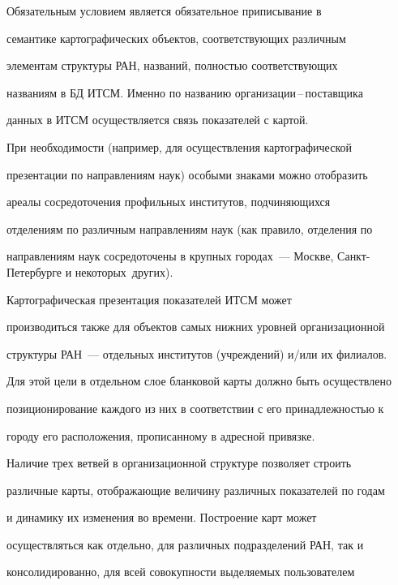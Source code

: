      


     Обязательным условием является обязательное приписывание в 


семантике картографических объектов, соответствующих различным 


элементам структуры РАН, названий, полностью соответствующих 


названиям в БД ИТСМ. Именно по названию организации\,--\,поставщика 


данных в ИТСМ осуществляется связь показателей с картой.


     





     При необходимости (например, для осуществления картографической 


презентации по направлениям наук) особыми знаками можно отобразить 


ареалы сосредоточения профильных институтов, подчиняющихся 


отделениям по различным направлениям наук (как правило, отделения по 


направлениям наук сосредоточены в крупных городах~--- Москве,  Санкт-Петербурге и некоторых~других).


     


     Картографическая презентация показателей ИТСМ может 


производиться также для объектов самых нижних уровней организационной 


структуры РАН~--- отдельных институтов (учреждений) и/или их филиалов. 


Для этой цели в отдельном слое бланковой карты должно быть осуществлено 


позиционирование каждого из них в соответствии с его принадлежностью к 


городу его расположения, прописанному в адресной привязке.


     


     Наличие трех ветвей в организационной структуре позволяет строить 


различные карты, отображающие величину различных показателей по годам 


и динамику их изменения во времени. Построение карт может 


осуществляться как отдельно, для различных подразделений РАН, так и 


консолидированно, для всей совокупности выделяемых пользователем 


